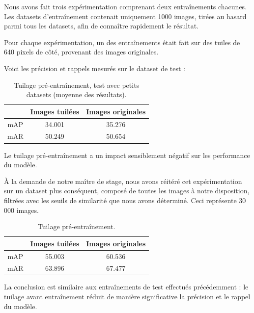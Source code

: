 Nous avons fait trois expérimentation comprenant deux entraînements chacunes.
Les datasets d'entraînement contenait uniquement 1000 images, tirées au hasard parmi tous les datasets,
afin de connaître rapidement le résultat.

Pour chaque expérimentation, un des entraînements était fait sur des tuiles de 640 pixels de côté,
provenant des images originales.

Voici les précision et rappels mesurés sur le dataset de test :\\

\begin{table}[h]
    \begin{center}
        \begin{tabular}{c c c}
            \hline
            & Images tuilées & Images originales \\
            \hline
            mAP & 34.001 & 35.276 \\
            mAR & 50.249 & 50.654 \\
        \end{tabular}
    \end{center}
    \caption{Tuilage pré-entraînement, test avec petits datasets (moyenne des résultats).}
\end{table}

Le tuilage pré-entraînement a un impact sensiblement négatif sur les performance du modèle.

À la demande de notre maître de stage, nous avons réitéré cet expérimentation sur un
dataset plus conséquent, composé de toutes les images à notre disposition, filtrées
avec les seuils de similarité que nous avons déterminé. Ceci représente
30 000 images.

\begin{table}[h]
    \begin{center}
        \begin{tabular}{c c c}
            \hline
            & Images tuilées & Images originales \\
            \hline
            mAP & 55.003 & 60.536 \\
            mAR & 63.896 & 67.477 \\
        \end{tabular}
    \end{center}
    \caption{Tuilage pré-entraînement.}
\end{table}

La conclusion est similaire aux entraînements de test effectués précédemment :
le tuilage avant entraînement réduit de manière significative la précision et
le rappel du modèle.

